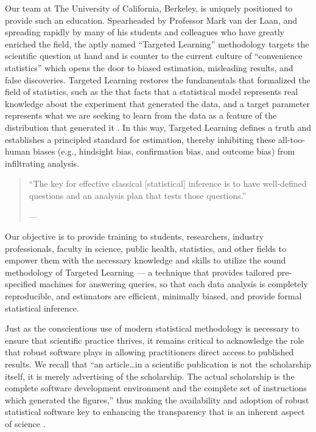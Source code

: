\documentclass[
  12pt, krantz2,
]{book}
\theoremstyle{definition}
\theoremstyle{definition}
\theoremstyle{definition}
\newcommand{\1}{\mathbbm{1}}
\begin{document}
Our team at The University of California, Berkeley, is uniquely positioned to
provide such an education. Spearheaded by Professor Mark van der Laan, and
spreading rapidly by many of his students and colleagues who have greatly
enriched the field, the aptly named ``Targeted Learning'' methodology targets the
scientific question at hand and is counter to the current culture of
``convenience statistics'' which opens the door to biased estimation, misleading
results, and false discoveries. Targeted Learning restores the fundamentals that
formalized the field of statistics, such as the that facts that a statistical
model represents real knowledge about the experiment that generated the data,
and a target parameter represents what we are seeking to learn from the data as
a feature of the distribution that generated it \citep{vdl2014entering}. In this way,
Targeted Learning defines a truth and establishes a principled standard for
estimation, thereby inhibiting these all-too-human biases (e.g., hindsight bias,
confirmation bias, and outcome bias) from infiltrating analysis.

\begin{quote}
``The key for effective classical {[}statistical{]} inference is to have
well-defined questions and an analysis plan that tests those questions.''

--- \citet{nosek2018preregistration}
\end{quote}

Our objective is to provide training to students, researchers, industry professionals, faculty in science, public health, statistics, and other
fields to empower them with the necessary knowledge and skills to utilize the
sound methodology of Targeted Learning --- a technique that provides tailored
pre-specified machines for answering queries, so that each data analysis is
completely reproducible, and estimators are efficient, minimally biased, and
provide formal statistical inference.

Just as the conscientious use of modern statistical methodology is necessary to
ensure that scientific practice thrives, it remains critical to acknowledge the
role that robust software plays in allowing practitioners direct access to
published results. We recall that ``an article\ldots in a scientific publication is
not the scholarship itself, it is merely advertising of the scholarship. The
actual scholarship is the complete software development environment and the
complete set of instructions which generated the figures,'' thus making the
availability and adoption of robust statistical software key to enhancing the
transparency that is an inherent aspect of science \citep{buckheit1995wavelab}.
\end{document}
